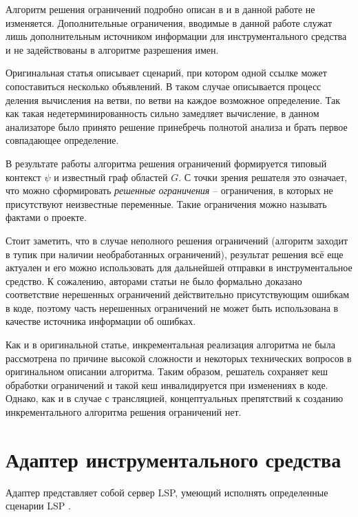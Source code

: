 Алгоритм решения ограничений подробно описан в \cite{scope-graphs-static-analysis} и в данной работе не изменяется.
Дополнительные ограничения, вводимые в данной работе служат лишь дополнительным источником информации для
инструментального средства и не задействованы в алгоритме разрешения имен.

Оригинальная статья описывает сценарий, при котором одной ссылке может сопоставиться несколько объявлений.
В таком случае описывается процесс деления вычисления на ветви, по ветви на каждое возможное определение.
Так как такая недетерминированность сильно замедляет вычисление, в данном анализаторе было принято решение
принебречь полнотой анализа и брать первое совпадающее определение.

В результате работы алгоритма решения ограничений формируется типовый контекст $\psi$ и известный граф областей
$G$. С точки зрения решателя это означает, что можно сформировать \textit{решенные ограничения} -- ограничения,
в которых не присутствуют неизвестные переменные. Такие ограничения можно называть фактами о проекте.

Стоит заметить, что в случае неполного решения ограничений (алгоритм заходит в тупик при наличии необработанных ограничений),
результат решения всё еще актуален и его можно использовать для дальнейшей отправки в инструментальное средство.
К сожалению, авторами статьи не было формально доказано соответствие нерешенных ограничений действительно присутствующим
ошибкам в коде, поэтому часть нерешенных ограничений не может быть использована в качестве источника информации об ошибках.

Как и в оригинальной статье, инкрементальная реализация алгоритма не была рассмотрена по причине высокой сложности
и некоторых технических вопросов в оригинальном описании алгоритма. Таким образом, решатель сохраняет кеш
обработки ограничений и такой кеш инвалидируется при изменениях в коде. Однако, как и в случае с трансляцией,
концептуальных препятствий к созданию инкрементального алгоритма решения ограничений нет.

\section{Адаптер инструментального средства}

Адаптер представляет собой сервер LSP, умеющий исполнять определенные сценарии LSP \cite{lsp-usecases}.


